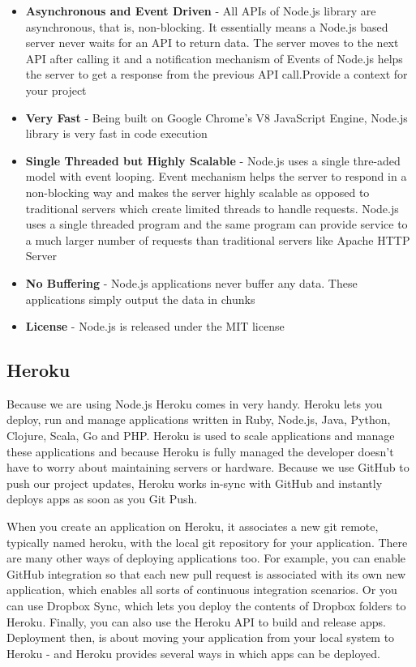 \begin{itemize}

\item \textbf{Asynchronous and Event Driven}  - All APIs of Node.js library are asynchronous, that is, non-blocking. It essentially means a Node.js based server never waits for an API to return data. The server moves to the next API after calling it and a notification mechanism of Events of Node.js helps the server to get a response from the previous API call.Provide a context for your project \cite{node2}

\item \textbf{Very Fast} - Being built on Google Chrome's V8 JavaScript Engine, Node.js library is very fast in code execution \cite{node2}

\item \textbf{Single Threaded but Highly Scalable} - Node.js uses a single thre-aded model with event looping. Event mechanism helps the server to respond in a non-blocking way and makes the server highly scalable as opposed to traditional servers which create limited threads to handle requests. Node.js uses a single threaded program and the same program can provide service to a much larger number of requests than traditional servers like Apache HTTP Server\cite{node2}

\item \textbf{No Buffering} - Node.js applications never buffer any data. These applications simply output the data in chunks \cite{node2}

\item \textbf{License} - Node.js is released under the MIT license \cite{node2}

\end{itemize}


\subsection{Heroku}
Because we are using Node.js Heroku comes in very handy. Heroku lets you deploy, run and manage applications written in Ruby, Node.js, Java, Python, Clojure, Scala, Go and PHP. \cite{heroku} Heroku is used to scale applications and manage these applications and because Heroku is fully managed the developer doesn't have to worry about maintaining servers or hardware. Because we use GitHub to push our project updates, Heroku works in-sync with GitHub and instantly deploys apps as soon as you Git Push.

When you create an application on Heroku, it associates a new git remote, typically named heroku, with the local git repository for your application.\cite{heroku} There are many other ways of deploying applications too. For example, you can enable GitHub integration so that each new pull request is associated with its own new application, which enables all sorts of continuous integration scenarios. Or you can use Dropbox Sync, which lets you deploy the contents of Dropbox folders to Heroku. Finally, you can also use the Heroku API to build and release apps. \cite{heroku} Deployment then, is about moving your application from your local system to Heroku - and Heroku provides several ways in which apps can be deployed. \cite{heroku}

